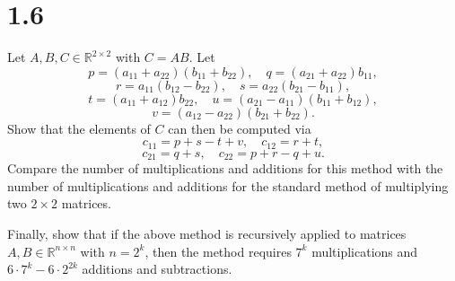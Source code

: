 \documentclass{article}
\begin{document}
\section*{1.6}
Let $A, B, C \in \mathbb{R}^{2 \times 2}$ with $C = AB$. Let
\[
p = (a_{11} + a_{22})(b_{11} + b_{22}), \quad q = (a_{21} + a_{22})b_{11},
\]
\[
r = a_{11}(b_{12} - b_{22}), \quad s = a_{22}(b_{21} - b_{11}),
\]
\[
t = (a_{11} + a_{12})b_{22}, \quad u = (a_{21} - a_{11})(b_{11} + b_{12}),
\]
\[
v = (a_{12} - a_{22})(b_{21} + b_{22}).
\]
Show that the elements of $C$ can then be computed via
\[
c_{11} = p + s - t + v, \quad c_{12} = r + t,
\]
\[
c_{21} = q + s, \quad c_{22} = p + r - q + u.
\]
Compare the number of multiplications and additions for this method with the number of multiplications and additions for the standard method of multiplying two $2 \times 2$ matrices.

Finally, show that if the above method is recursively applied to matrices $A, B \in \mathbb{R}^{n \times n}$ with $n = 2^k$, then the method requires $7^k$ multiplications and $6 \cdot 7^k - 6 \cdot 2^{2k}$ additions and subtractions.
\end{document}

